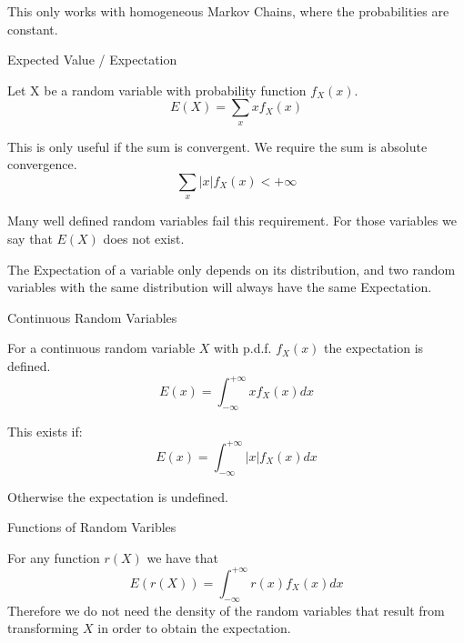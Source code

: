 \documentclass{report}
\begin{document}
\begin{description}
        \begin{mdframed}
            This only works with homogeneous Markov Chains,
            where the probabilities are constant.
        \end{mdframed}

    \pagebreak
    \item {\large Expected Value / Expectation}
        \begin{mdframed}
            Let X be a random variable with probability
            function $f_X(x)$.
            \begin{displaymath}
                E(X) = \sum_x xf_X(x)
            \end{displaymath}

            This is only useful if the sum is convergent.
            We require the sum is absolute convergence.
            \begin{displaymath}
                \sum_x |x| f_X(x) < +\infty
            \end{displaymath}

            Many well defined random variables fail this
            requirement. For those variables we say that
            $E(X)$ does not exist.
            
            
            The Expectation of a variable only depends on its
            distribution, and two random variables with the
            same distribution will always have the same
            Expectation.
        \end{mdframed}
    \item {\large Continuous Random Variables}
        \begin{mdframed}
            For a continuous random variable $X$ with p.d.f. 
            $f_X(x)$ the expectation is defined.
             \begin{displaymath}
                E(x) = \int_{-\infty}^{+\infty} x f_X(x) dx
            \end{displaymath}

            This exists if:
            \begin{displaymath}
                E(x) = \int_{-\infty}^{+\infty} |x| f_X(x) dx
            \end{displaymath}
            
            Otherwise the expectation is undefined.
        \end{mdframed}
    \item {\large Functions of Random Varibles}
        \begin{mdframed}
            For any function $r(X)$ we have that
            \begin{displaymath}
                E(r(X)) = \int_{-\infty}^{+\infty} r(x) f_X(x) dx 
            \end{displaymath}
            Therefore we do not need the density of the random
            variables that result from transforming $X$ in order
            to obtain the expectation. 


\end{mdframed}
\end{description}
\end{document}

